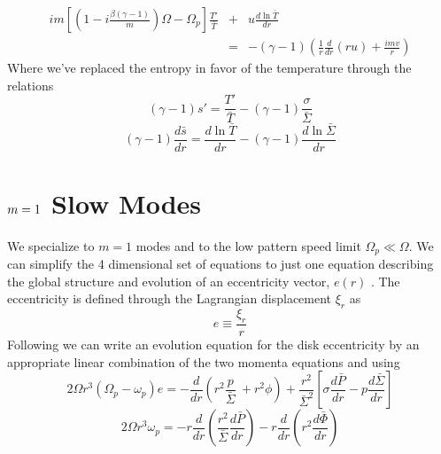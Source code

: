 \documentclass[apj]{emulateapj}
\begin{document}
\begin{eqnarray}  \label{eq:dtT}
i m \left[ \left( 1 - i \frac{\beta(\gamma -1)}{m} \right) \Omega - \Omega_p \right] \frac{T'}{\bar{T} } &+& u \frac{d  \ln \bar{T}}{d r}   \\ 
&=& -(\gamma -1)  \left( \frac{1}{r} \frac{d }{d r} ( r u) + \frac{ i m v}{r } \right) \nonumber
\end{eqnarray}
Where we've replaced the entropy in favor of the temperature through the relations
\begin{equation}
(\gamma -1)s' = \frac{ T'}{ \bar{T}} - (\gamma -1 ) \frac{ \sigma}{ \bar{\Sigma}} 
\end{equation}
\begin{equation}
(\gamma -1)\frac{d \bar{s}}{d r} = \frac{d \ln \bar{T}}{d r} - (\gamma -1) \frac{ d \ln \bar{\Sigma}}{d r} 
\end{equation}


\section{ $\MakeLowercase{m}=1$ Slow Modes }
We specialize to $m=1$ modes and to the low pattern speed limit $\Omega_p \ll \Omega$. We can simplify the 4 dimensional set of equations to just one equation describing the global structure and evolution of an eccentricity vector, $e(r)$ \citep{og01,go06,papa02}. The eccentricity is defined through the Lagrangian displacement $\xi_r$ as 
\begin{equation}
e \equiv \frac{ \xi_r} {r} 
\end{equation}
 Following \cite{papa02} we can write an evolution equation for the disk eccentricity by an appropriate linear combination of the two momenta equations and using 
 \begin{equation}
2 \Omega r^3 ( \Omega_p - \omega_p) e = - \frac{d }{dr} \left( r^2 \frac{p}{\bar{\Sigma}} \ + r^2 \phi \right) + \frac{r^2}{\bar{\Sigma}^2} \left[  \sigma \frac{ d \bar{P}}{d r}-p \frac{d \bar{\Sigma}}{d r} \right]
\end{equation}
\begin{equation} \label{eq:wp_def}
2 \Omega r^3 \omega_p = - r \frac{d}{dr} \left( \frac{r^2}{\bar{\Sigma}} \frac{d \bar{P}}{d r} \right) - r \frac{ d}{dr} \left( r^2 \frac{d \bar{\Phi}}{dr} \right)
\end{equation}
\end{document}
